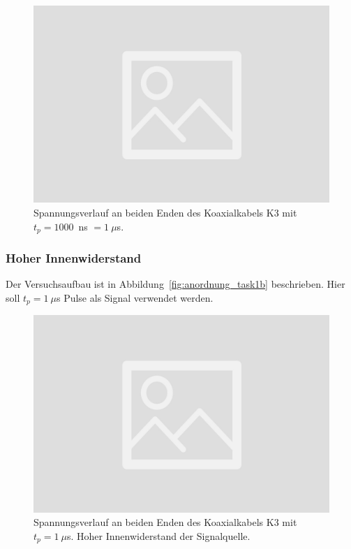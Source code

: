 \documentclass{article}
\begin{document}
\begin{figure}[H]
\centering
\caption{Spannungsverlauf an beiden Enden des Koaxialkabels K3 mit $t_p=1000$~ns $ = 1~\mu$s.}
\label{fig:task1a_1000ns}
\includegraphics[scale=0.1]{bilder/task1a/leer.jpg}
\end{figure}




\subsubsection{Hoher Innenwiderstand}
Der Versuchsaufbau ist in Abbildung~\ref{fig:anordnung_task1b} beschrieben. Hier soll $t_p = 1~\mu$s Pulse als Signal verwendet werden.


\begin{figure}[H]
\centering
\caption{Spannungsverlauf an beiden Enden des Koaxialkabels K3 mit $t_p= 1~\mu$s. Hoher Innenwiderstand der Signalquelle.}
\label{fig:task1b}
\includegraphics[scale=0.1]{bilder/task1a/leer.jpg}
\end{figure}
\end{document}
